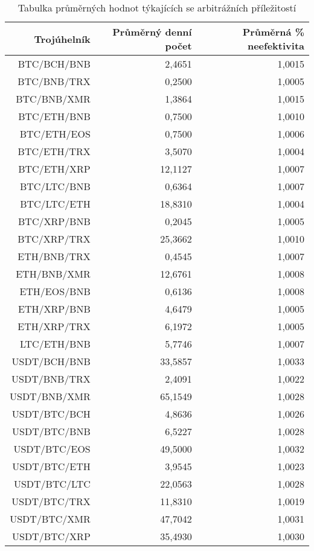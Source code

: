 \begin{table}\centering
\caption{Tabulka průměrných hodnot týkajících se arbitrážních příležitostí}
\label{table_averages}
\begin{tabular}{|| r | r | r ||}\hline Trojúhelník & Průměrný denní počet & Průměrná \% neefektivita\\ [0.5ex]
 \hline\hline BTC/BCH/BNB & 2,4651 & 1,0015\\ 
 \hline BTC/BNB/TRX & 0,2500 & 1,0005\\ 
 \hline BTC/BNB/XMR & 1,3864 & 1,0015\\ 
 \hline BTC/ETH/BNB & 0,7500 & 1,0010\\ 
 \hline BTC/ETH/EOS & 0,7500 & 1,0006\\ 
 \hline BTC/ETH/TRX & 3,5070 & 1,0004\\ 
 \hline BTC/ETH/XRP & 12,1127 & 1,0007\\ 
 \hline BTC/LTC/BNB & 0,6364 & 1,0007\\ 
 \hline BTC/LTC/ETH & 18,8310 & 1,0004\\ 
 \hline BTC/XRP/BNB & 0,2045 & 1,0005\\ 
 \hline BTC/XRP/TRX & 25,3662 & 1,0010\\ 
 \hline ETH/BNB/TRX & 0,4545 & 1,0007\\ 
 \hline ETH/BNB/XMR & 12,6761 & 1,0008\\ 
 \hline ETH/EOS/BNB & 0,6136 & 1,0008\\ 
 \hline ETH/XRP/BNB & 4,6479 & 1,0005\\ 
 \hline ETH/XRP/TRX & 6,1972 & 1,0005\\ 
 \hline LTC/ETH/BNB & 5,7746 & 1,0007\\ 
 \hline USDT/BCH/BNB & 33,5857 & 1,0033\\ 
 \hline USDT/BNB/TRX & 2,4091 & 1,0022\\ 
 \hline USDT/BNB/XMR & 65,1549 & 1,0028\\ 
 \hline USDT/BTC/BCH & 4,8636 & 1,0026\\ 
 \hline USDT/BTC/BNB & 6,5227 & 1,0028\\ 
 \hline USDT/BTC/EOS & 49,5000 & 1,0032\\ 
 \hline USDT/BTC/ETH & 3,9545 & 1,0023\\ 
 \hline USDT/BTC/LTC & 22,0563 & 1,0028\\ 
 \hline USDT/BTC/TRX & 11,8310 & 1,0019\\ 
 \hline USDT/BTC/XMR & 47,7042 & 1,0031\\ 
 \hline USDT/BTC/XRP & 35,4930 & 1,0030\\ 

\end{tabular}
\end{table}
